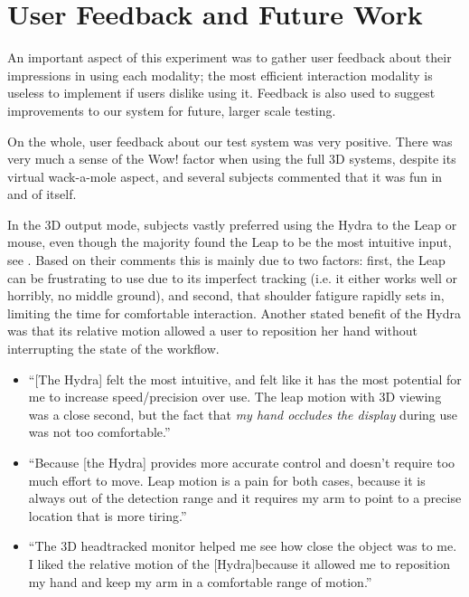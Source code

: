 \section{User Feedback and Future Work}\label{sec:feedback}

An important aspect of this experiment was to gather user feedback about their
impressions in using each modality; the most efficient interaction modality is
useless to implement if users dislike using it.  Feedback is also used to
suggest improvements to our system for future, larger scale testing.

On the whole, user feedback about our test system was very positive.  There
was very much a sense of the Wow! factor when using the full 3D systems,
despite its virtual wack-a-mole aspect, and several subjects commented that it
was fun in and of itself.

In the 3D output mode, subjects vastly preferred using the Hydra to the Leap
or mouse, even though the majority found the Leap to be the most intuitive
input, see .  Based on their comments this is mainly due to
two factors: first, the Leap can be frustrating to use due to its imperfect
tracking (i.e. it either works well or horribly, no middle ground), and
second, that shoulder fatigure rapidly sets in, limiting the time for
comfortable interaction.  Another stated benefit of the Hydra was that its
relative motion allowed a user to reposition her hand without interrupting the
state of the workflow.

\begin{itemize}
\item ``[The Hydra] felt the most intuitive, and felt like it has the most
  potential for me to increase speed/precision over use.  The leap motion with
  3D viewing was a close second, but the fact that \emph{my hand occludes the
  display} during use was not too comfortable.''
\item ``Because [the Hydra] provides more accurate control and doesn't require
  too much effort to move. Leap motion is a pain for both cases, because it is
  always out of the detection range and it requires my arm to point to a
  precise location that is more tiring.''
\item ``The 3D headtracked monitor helped me see how close the object was to
  me. I liked the relative motion of the [Hydra]because it allowed me to
  reposition my hand and keep my arm in a comfortable range of motion.''
\end{itemize}

